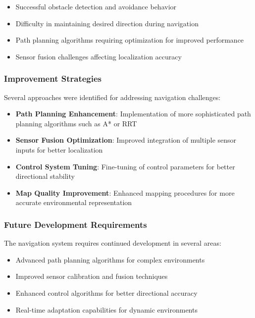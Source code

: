 \documentclass{book}
\begin{document}
\begin{itemize}
\item Successful obstacle detection and avoidance behavior
\item Difficulty in maintaining desired direction during navigation
\item Path planning algorithms requiring optimization for improved performance
\item Sensor fusion challenges affecting localization accuracy
\end{itemize}

\subsubsection{Improvement Strategies}
\par\noindent Several approaches were identified for addressing navigation challenges:

\begin{itemize}
\item \textbf{Path Planning Enhancement}: Implementation of more sophisticated path planning algorithms such as A* or RRT
\item \textbf{Sensor Fusion Optimization}: Improved integration of multiple sensor inputs for better localization
\item \textbf{Control System Tuning}: Fine-tuning of control parameters for better directional stability
\item \textbf{Map Quality Improvement}: Enhanced mapping procedures for more accurate environmental representation
\end{itemize}

\subsubsection{Future Development Requirements}
\par\noindent The navigation system requires continued development in several areas:

\begin{itemize}
\item Advanced path planning algorithms for complex environments
\item Improved sensor calibration and fusion techniques
\item Enhanced control algorithms for better directional accuracy
\item Real-time adaptation capabilities for dynamic environments
\end{itemize}
\end{document}
